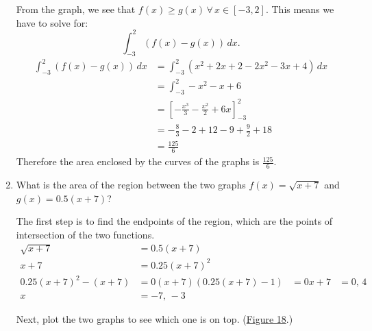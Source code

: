 \documentclass[12pt]{article}
\begin{document}
\begin{enumerate}
          From the graph, we see that $f(x) \ge g(x) \, \forall \, x \in [-3, 2]$. This means we have to solve for:
          \[ \int_{-3}^2 \left( f(x) - g(x) \right) \, dx. \]
          \begin{align*}
              \int_{-3}^2 \left( f(x) - g(x) \right) \, dx & = \int_{-3}^2 \left( x^2 + 2x + 2 - 2x^2 - 3x + 4 \right) \, dx \\[6pt]
                                                           & = \int_{-3}^2 -x^2 - x + 6                                      \\[6pt]
                                                           & = \left[ -\frac{x^3}{3} -\frac{x^2}{2} + 6x \right]_{-3}^2      \\[6pt]
                                                           & = -\frac{8}{3} - 2 + 12 - 9 +\frac{9}{2} + 18                   \\[6pt]
                                                           & = \frac{125}{6}
          \end{align*}
          Therefore the area enclosed by the curves of the graphs is $\frac{125}{6}$.
          \smallskip

    \item What is the area of the region between the two graphs $f(x) = \sqrt{x+7}$ and $g(x) = 0.5(x+7)$?

          The first step is to find the endpoints of the region, which are the points of intersection of the two functions.
          \begin{align*}
              \sqrt{x+7}                         & = 0.5(x+7)    \\
              x+7                                & = 0.25(x+7)^2 \\
              0.25(x+7)^2 - (x+7)                & = 0
              (x+7) \left( 0.25(x+7) - 1 \right) & = 0
              x+7                                & = 0, \, 4     \\
              x                                  & = -7, \, -3
          \end{align*}

          Next, plot the two graphs to see which one is on top. (\hyperref[fig:abcx2]{Figure 18}.)


\end{enumerate}
\end{document}
